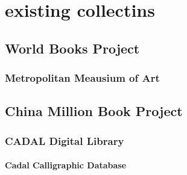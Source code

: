 \chapter{existing collectins}

\section{World Books Project}

\subsection{Metropolitan Meausium of Art}

\section{China Million Book Project}

\subsection{CADAL Digital Library}

\subsubsection{Cadal Calligraphic Database}

